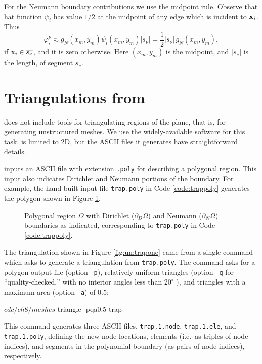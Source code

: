 For the Neumann boundary contributions we use the midpoint rule.  Observe that hat function $\psi_i$ has value $1/2$ at the midpoint of any edge which is incident to $\mathbf{x}_i$.  Thus
\begin{equation}
\varphi_i^\nu \approx g_N(x_m,y_m) \psi_i(x_m,y_m) |s_\nu| = \frac{1}{2} |s_\nu|\, g_N(x_m,y_m), \label{eq:un:segmentquadrature}
\end{equation}
if $\mathbf{x}_i \in \overline{s_\nu}$, and it is zero otherwise.  Here $(x_m,y_m)$ is the midpoint, and $|s_\nu|$ is the length, of segment $s_\nu$.


\section{Triangulations from \Triangle}

\PETSc does not include tools for triangulating regions of the plane, that is, for generating unstructured meshes.  We use the widely-available \Triangle{} software \citep{Shewchuk1996} for this task.  \Triangle is limited to 2D, but the ASCII files it generates have straightforward details.

\Triangle inputs an ASCII file with extension \texttt{.poly} for describing a polygonal region.  This input also indicates Dirichlet and Neumann portions of the boundary.  For example, the hand-built input file \texttt{trap.poly} in Code \ref{code:trappoly} generates the polygon shown in Figure \ref{fig:un:trap}.

\begin{figure}

\caption{Polygonal region $\Omega$ with Dirichlet ($\partial_D\Omega$) and Neumann ($\partial_N \Omega$) boundaries as indicated, corresponding to \texttt{trap.poly} in Code \ref{code:trappoly}.}
\label{fig:un:trap}
\end{figure}


The triangulation shown in Figure \ref{fig:un:trapone} came from a single command which asks \Triangle to generate a triangulation from \texttt{trap.poly}.  The command asks for a polygon output file (option \texttt{-p}), relatively-uniform triangles (option \texttt{-q} for ``quality-checked,'' with no interior angles less than $20^\circ$ \citep{Shewchuk1996}), and triangles with a maximum area (option \texttt{-a}) of $0.5$:
\begin{cline}
$ cd c/ch8/meshes
$ triangle -pqa0.5 trap
\end{cline}
This command generates three ASCII files, \texttt{trap.1.node}, \texttt{trap.1.ele}, and \texttt{trap.1.poly}, defining the new node locations, elements (i.e.~as triples of node indices), and segments in the polynomial boundary (as pairs of node indices), respectively.

